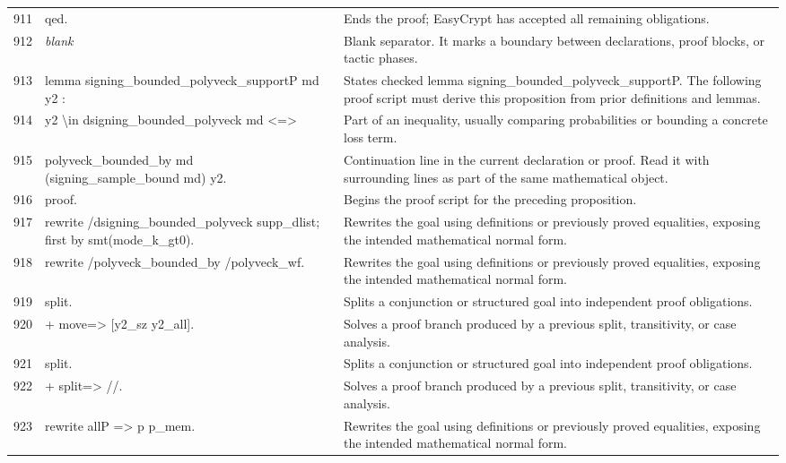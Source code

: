 \documentclass[10pt]{article}
\begin{document}
\begin{longtable}{r L{0.53\textwidth} L{0.37\textwidth}}
911 & {\ttfamily\scriptsize qed.} & Ends the proof; EasyCrypt has accepted all remaining obligations. \\
912 & {\ttfamily\scriptsize \emph{blank}} & Blank separator.  It marks a boundary between declarations, proof blocks, or tactic phases. \\
913 & {\ttfamily\scriptsize lemma signing\_bounded\_polyveck\_supportP md y2 :} & States checked lemma signing\_bounded\_polyveck\_supportP.  The following proof script must derive this proposition from prior definitions and lemmas. \\
914 & {\ttfamily\scriptsize   y2 \textbackslash{}in dsigning\_bounded\_polyveck md <=>} & Part of an inequality, usually comparing probabilities or bounding a concrete loss term. \\
915 & {\ttfamily\scriptsize   polyveck\_bounded\_by md (signing\_sample\_bound md) y2.} & Continuation line in the current declaration or proof.  Read it with surrounding lines as part of the same mathematical object. \\
916 & {\ttfamily\scriptsize proof.} & Begins the proof script for the preceding proposition. \\
917 & {\ttfamily\scriptsize rewrite /dsigning\_bounded\_polyveck supp\_dlist; first by smt(mode\_k\_gt0).} & Rewrites the goal using definitions or previously proved equalities, exposing the intended mathematical normal form. \\
918 & {\ttfamily\scriptsize rewrite /polyveck\_bounded\_by /polyveck\_wf.} & Rewrites the goal using definitions or previously proved equalities, exposing the intended mathematical normal form. \\
919 & {\ttfamily\scriptsize split.} & Splits a conjunction or structured goal into independent proof obligations. \\
920 & {\ttfamily\scriptsize + move=> [y2\_sz y2\_all].} & Solves a proof branch produced by a previous split, transitivity, or case analysis. \\
921 & {\ttfamily\scriptsize   split.} & Splits a conjunction or structured goal into independent proof obligations. \\
922 & {\ttfamily\scriptsize   + split=> //.} & Solves a proof branch produced by a previous split, transitivity, or case analysis. \\
923 & {\ttfamily\scriptsize     rewrite allP => p p\_mem.} & Rewrites the goal using definitions or previously proved equalities, exposing the intended mathematical normal form. \\

\end{longtable}
\end{document}
